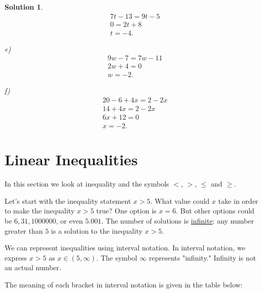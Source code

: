 \documentclass[12pt]{article}
\newtheorem{sol}[prop]{Solution}
\begin{document}
\begin{sol}
\begin{equation*}
\begin{split}
& 7t-13=9t-5\\
& 0=2t+8\\
& t=-4.
\end{split}
\end{equation*}
\item[e)] \begin{equation*}
\begin{split}
& 9w-7=7w-11\\
& 2w+4=0\\
& w=-2.
\end{split}
\end{equation*}
\item[f)] \begin{equation*}
\begin{split}
& 20-6+4x=2-2x\\
& 14+4x=2-2x\\
& 6x+12=0\\
& x=-2.
\end{split}
\end{equation*}
\end{sol}

\section{Linear Inequalities}
In this section we look at inequality and the symbols $<$, $>$, $\leq$ and $\geq$. 

Let's start with the inequality statement $x>5$. What value could $x$ take in order to make the inequality $x>5$ true? One option is $x=6$. But other options could be $6, 31, 1000000$, or even $5.001$. The number of solutions is \underline{infinite}: any number greater than $5$ is a solution to the inequality $x>5$. 

We can represent inequalities using interval notation.  In interval notation, we express $x>5$ as $x\in (5, \infty)$. The symbol $\infty$ represents "infinity." Infinity is not an actual number. 

The meaning of each bracket in interval notation is given in the table below:
\end{document}
